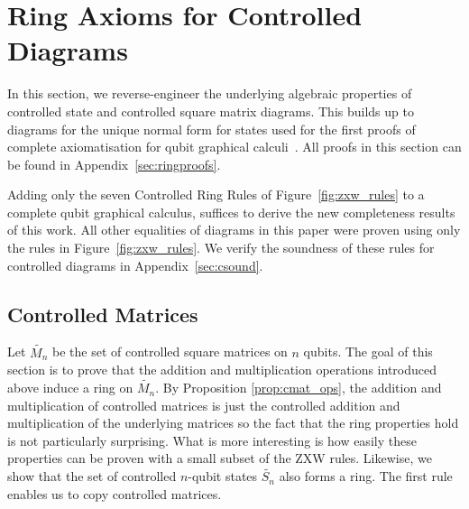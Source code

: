 \section{Ring Axioms for Controlled Diagrams}\label{sec:ring}
In this section, we reverse-engineer the underlying algebraic properties of controlled state and controlled square matrix diagrams. This builds up to diagrams for the unique normal form for states used for the first proofs of complete axiomatisation for qubit graphical calculi~\cite{hadzihasanovic2017thesis, Hadzihasanovic2018zwzxcomplete}.
All proofs in this section can be found in Appendix~\ref{sec:ringproofs}.

Adding only the seven Controlled Ring Rules of Figure~\ref{fig:zxw_rules} to a complete qubit graphical calculus, suffices to derive the new completeness results of this work.
All other equalities of diagrams in this paper were proven using only the rules in Figure~\ref{fig:zxw_rules}. We verify the soundness of these rules for controlled diagrams in Appendix~\ref{sec:csound}.


\subsection{Controlled Matrices}

Let $\tilde{M_n}$ be the set of controlled square matrices on $n$ qubits. The goal of this section is to prove that the addition and multiplication operations introduced above induce a ring on $\tilde{M_n}$. By Proposition \ref{prop:cmat_ops}, the addition and multiplication of controlled matrices is just the controlled addition and multiplication of the underlying matrices so the fact that the ring properties hold is not particularly surprising. What is more interesting is how easily these properties can be proven with a small subset of the ZXW rules. Likewise, we show that the set of controlled $n$-qubit states $\tilde{S_n}$ also forms a ring. The first rule enables us to copy controlled matrices.

